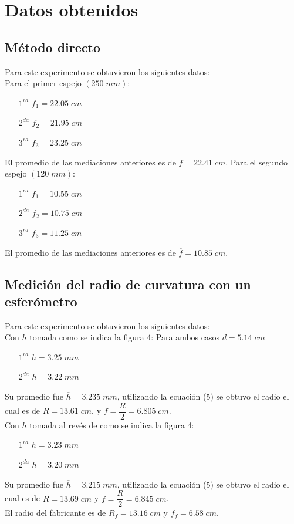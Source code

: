 \documentclass[13,twocolumn,letterpaper]{article}
\begin{document}
\section*{Datos obtenidos}
{

\subsection*{Método directo}
{
	Para este experimento se obtuvieron los siguientes datos:\\
	Para el primer espejo $(250\;mm)$:
	\begin{itemize}
		\item [ $1^{ra}$ ] $f_{1}=22.05\; cm$
		\item [ $2^{da}$ ] $f_{2}=21.95\; cm$
		\item [ $3^{ra}$ ] $f_{3}=23.25\; cm$
	\end{itemize}
El promedio de las mediaciones anteriores es de $\overline{f}=22.41\;cm$.
Para el segundo espejo $(120\;mm)$:
\begin{itemize}
	\item [ $1^{ra}$ ] $f_{1}=10.55\; cm$
	\item [ $2^{da}$ ] $f_{2}=10.75\; cm$
	\item [ $3^{ra}$ ] $f_{3}=11.25\; cm$
\end{itemize}
El promedio de las mediaciones anteriores es de $\overline{f}=10.85\;cm$.\\
}
\subsection{Medición del radio de curvatura con un esferómetro}
{
Para este experimento se obtuvieron los siguientes datos:\\
Con $h$ tomada como se indica la figura 4:
Para ambos casos $d=5.14 \;cm$ 
\begin{itemize}
	\item [ $1^{ra}$ ] $h=3.25\; mm $
	\item [ $2^{da}$ ] $h=3.22\; mm $
\end{itemize}
Su promedio fue $\overline{h}=3.235 \;mm$, utilizando la ecuación (5) se obtuvo el radio el cual es de $R=13.61 \;cm$, y $f=\dfrac{R}{2}=6.805\;cm$.\\
Con $h$ tomada al revés de  como se indica la figura 4:
\begin{itemize}
	\item [ $1^{ra}$ ] $h=3.23\; mm $
	\item [ $2^{da}$ ] $h=3.20\; mm $
\end{itemize}	
Su promedio fue $\overline{h}=3.215 \;mm$, utilizando la ecuación (5) se obtuvo el radio el cual es de $R=13.69 \;cm$  y $f=\dfrac{R}{2}=6.845\;cm$.
\\El radio del fabricante es de $R_{f}=13.16\;cm$ y  $f_{f}=6.58 \;cm$.
}
}
\end{document}
